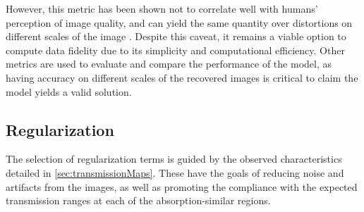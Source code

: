 \documentclass[nomenclature, english, bibtex]{kththesis}
\numberwithin{listing}{chapter}
\begin{document}
However, this metric has been shown not to correlate well with humans’ perception of image quality,
and can yield the same quantity over distortions on different scales of the image \cite[Figure~2]{wangMultiscaleStructuralSimilarity2003}.
Despite this caveat, it remains a viable option to compute data fidelity due to its simplicity and computational efficiency.
Other metrics are used to evaluate and compare the performance of the model, as having accuracy on different scales of the
recovered images is critical to claim the model yields a valid solution.

\subsection{Regularization}

The selection of regularization terms is guided by the observed characteristics detailed in \autoref{sec:transmissionMaps}.
These have the goals of reducing noise and artifacts from the images, as well as promoting the
compliance with the expected transmission ranges at each of the absorption-similar regions.
\end{document}
